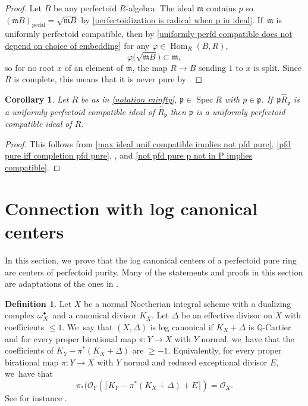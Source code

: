 \documentclass[JEP,XML,SOM,Unicode,published]{cedram}
\let\autoref\cref
\newcommand{\sbullet}{{\scriptscriptstyle\bullet}}
\newcommand{\csbullet}{{\raisebox{1pt}{$\sbullet$}}}
\theoremstyle{plain}
\newtheorem{corollary}[theorem]{Corollary}
\theoremstyle{definition}
\newtheorem{definition}[theorem]{Definition}
\numberwithin{equation}{theorem}
\newcommand{\Q}{\mathbb {Q}}
\newcommand{\fram}{\mathfrak{m}}
\newcommand{\p}{\mathfrak{p}}
\DeclareMathOperator{\Hom}{Hom}
\newcommand{\perfd}{_{\mathrm{perfd}}}
\DeclareMathOperator{\Spec}{{Spec}}
\newcommand{\sO}{\mathcal{O}}
\renewcommand{\phi}{\varphi}
\begin{document}
\begin{proof}
Let $B$ be any perfectoid $R$\nobreakdash-algebra.
The ideal $\fram$ contains $p$ so $(\fram B)\perfd=\sqrt{\fram B}$ by \autoref{perfectoidization is radical when p in ideal}. If~$\fram$ is uniformly perfectoid compatible, then by \autoref{uniformly perfd compatible does not depend on choice of embedding} for any $\phi\in \Hom_R(B,R)$,
\[
\phi\bigl(\sqrt{\fram B}\bigr)\subset \fram,
\]
so for no root $x$ of an element of $\fram$, the map $R\to B$ sending $1$ to $x$ is split. Since $R$ is complete, this means that it is never pure by \cite[Lem.\,1.2]{FedderFPureRat}.
\end{proof}

\begin{corollary}\label{loc is uniformly compatible then ideal is uniformly compatible}
Let $R$ be as in \autoref{notation rainfty}, $\p\in \Spec R$ with $p\in \p$. If~$\p \widehat{R}_\p$ is a uniformly perfectoid compatible ideal of $\widehat{R}_\p$ then $\p$ is a uniformly perfectoid compatible ideal of $R$.
\end{corollary}

\begin{proof}
This follows from \autoref{max ideal unif compatible implies not pfd pure}, \autoref{pfd pure iff completion pfd pure}, \cite[Ex.\,3.8\,(7)]{BhattIyengarMaRegularRings},
and \autoref{not pfd pure p not in P implies compatible}.
\end{proof}

\section{Connection with log canonical centers}

In this section, we~prove that the log canonical centers of a perfectoid pure ring are centers of perfectoid purity. Many of the statements and proofs in this section are adaptations of the ones in \cite{BMPSTWWPerfectoidPure}.

\begin{definition}
Let $X$ be a normal Noetherian integral scheme with a dualizing complex $\omega^\csbullet_X$ and a canonical divisor $K_X$. Let $\Delta$ be an effective divisor on $X$ with coefficients $\leq 1$. We~say that $(X,\Delta)$ is log canonical if $K_X+\Delta$ is $\Q$-Cartier and for every proper birational map $\pi\colon Y\to X$ with $Y$ normal, we~have that the coefficients of $K_Y-\pi^*(K_X+\Delta)$ are $\geq -1$. Equivalently, for every proper birational map $\pi\colon Y\to X$ with $Y$ normal and reduced exceptional divisor $E$, we~have that
\begin{equation}\label{def lc}
\pi_*(\sO_Y(\lceil K_Y - \pi^*(K_X+\Delta) + E\rceil)=\sO_X.
\end{equation}
See for instance \cite[Cor.\,2.31]{KollarMori}.
\end{definition}
\end{document}
